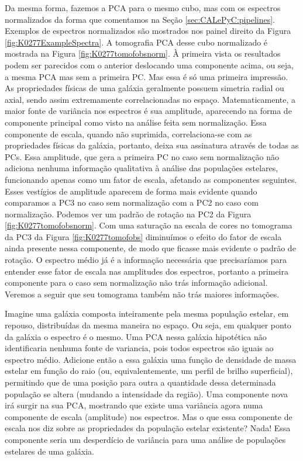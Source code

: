 Da mesma forma, fazemos a PCA para o mesmo cubo, mas com os espectros normalizados da forma que comentamos na Seção
\ref{sec:CALePyC:pipelines}. Exemplos de espectros normalizados são mostrados nos painel direito da Figura
\ref{fig:K0277ExampleSpectra}. A tomografia PCA desse cubo normalizado é mostrada na Figura \ref{fig:K0277tomofobsnorm}.
À primeira vista os resultados podem ser parecidos com o anterior deslocando uma componente acima, ou seja, a mesma PCA
mas sem a primeira PC. Mas essa é só uma primeira impressão. As propriedades físicas de uma galáxia geralmente possuem
simetria radial ou axial, sendo assim extremamente correlacionadas no espaço. Matematicamente, a maior fonte de
variância nos espectros é sua amplitude, aparecendo na forma de componente principal como visto na análise feita sem
normalização. Essa componente de escala, quando não suprimida, correlaciona-se com as propriedades físicas da galáxia,
portanto, deixa sua assinatura através de todas as PCs. Essa amplitude, que gera a primeira PC no caso sem normalização
não adiciona nenhuma informação qualitativa à análise das populações estelares, funcionando apenas como um fator de
escala, afetando as componentes seguintes. Esses vestígios de amplitude aparecem de forma mais evidente quando
comparamos a PC3 no caso sem normalização com a PC2 no caso com normalização. Podemos ver um padrão de rotação na PC2 da
Figura \ref{fig:K0277tomofobsnorm}. Com uma saturação na escala de cores no tomograma da PC3 da Figura
\ref{fig:K0277tomofobs} diminuímos o efeito do fator de escala ainda presente nessa componente, de modo que ficasse mais
evidente o padrão de rotação. O espectro médio já é a informação necessária que precisaríamos para entender esse fator
de escala nas amplitudes dos espectros, portanto a primeira componente para o caso sem normalização não trás informação
adicional. Veremos a seguir que seu tomograma também não trás maiores informações.

Imagine uma galáxia composta inteiramente pela mesma população estelar, em repouso, distribuídas da mesma maneira no
espaço. Ou seja, em qualquer ponto da galáxia o espectro é o mesmo. Uma PCA nessa galáxia hipotética não identificaria
nenhuma fonte de variancia, pois todos espectros são iguais ao espectro médio. Adicione então a essa galáxia uma função
de densidade de massa estelar em função do raio (ou, equivalentemente, um perfil de brilho superficial), permitindo que
de uma posição para outra a quantidade dessa determinada população se altera (mudando a intensidade da região). Uma
componente nova irá surgir na sua PCA, mostrando que existe uma variância agora numa componente de escala (amplitude)
nos espectros. Mas o que essa componente de escala nos diz sobre as propriedades da população estelar existente? Nada!
Essa componente seria um desperdício de variância para uma análise de populações estelares de uma galáxia.

